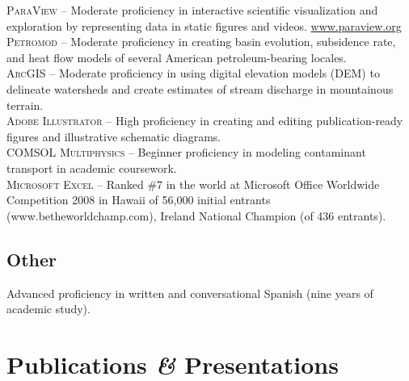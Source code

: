 \documentclass[11pt, letterpaper]{article}
\newcommand{\amper}{{\fontspec[Scale=.95]{Adobe Caslon Pro}\selectfont\itshape\&}}
\begin{document}
\textsc{ParaView} – Moderate proficiency in interactive scientific visualization and exploration by representing data in static figures and videos. \href{https://www.paraview.org/}{www.paraview.org} \\[5pt]
\textsc{Petromod} – Moderate proficiency in creating basin evolution, subsidence rate, and heat flow models of several American petroleum-bearing locales.\\[5pt] 
\textsc{ArcGIS} – Moderate proficiency in using digital elevation models (DEM) to delineate watersheds and create estimates of stream discharge in mountainous terrain.\\[5pt] 
\textsc{Adobe Illustrator} – High proficiency in creating and editing publication-ready figures and illustrative schematic diagrams.\\[5pt] 
\textsc{COMSOL Multiphysics} – Beginner proficiency in modeling contaminant transport in academic coursework.\\[5pt] 
\textsc{Microsoft Excel} – Ranked \#7 in the world at Microsoft Office Worldwide Competition 2008 in Hawaii of 56,000 initial entrants (www.betheworldchamp.com), Ireland National Champion (of 436 entrants).
\subsection*{Other}
\noindent
Advanced proficiency in written and conversational Spanish (nine years of academic study).


\section*{Publications \amper{} Presentations}
\label{sec:pubs}  %

\end{document}
